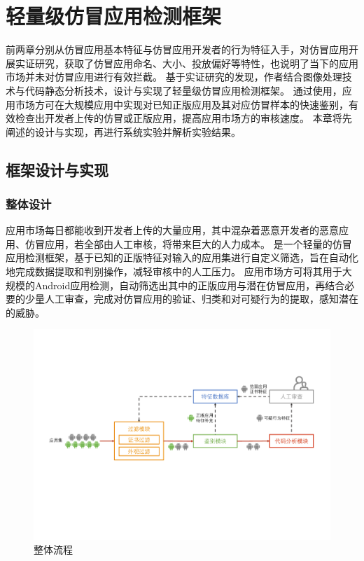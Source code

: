 \chapter{轻量级仿冒应用检测框架\mytool}
\label{chp:framework_prototype}

前两章分别从仿冒应用基本特征与仿冒应用开发者的行为特征入手，对仿冒应用开展实证研究，获取了仿冒应用命名、大小、投放偏好等特性，也说明了当下的应用市场并未对仿冒应用进行有效拦截。
基于实证研究的发现，作者结合图像处理技术与代码静态分析技术，设计与实现了轻量级仿冒应用检测框架\mytool 。
通过使用\mytool ，应用市场方可在大规模应用中实现对已知正版应用及其对应仿冒样本的快速鉴别，有效检查出开发者上传的仿冒或正版应用，提高应用市场方的审核速度。
本章将先阐述\mytool 的设计与实现，再进行系统实验并解析实验结果。

\section{框架设计与实现}

\subsection{整体设计}
应用市场每日都能收到开发者上传的大量应用，其中混杂着恶意开发者的恶意应用、仿冒应用，若全部由人工审核，将带来巨大的人力成本。
\mytool 是一个轻量的仿冒应用检测框架，基于已知的正版特征对输入的应用集进行自定义筛选，旨在自动化地完成数据提取和判别操作，减轻审核中的人工压力。
应用市场方可将其用于大规模的Android应用检测，自动筛选出其中的正版应用与潜在仿冒应用，再结合必要的少量人工审查，完成对仿冒应用的验证、归类和对可疑行为的提取，感知潜在的威胁。

\begin{figure}[htbp]
    \centering
    \includegraphics[width=\textwidth]{./Figures/edwin-fakerevealer-detector}
    \caption{\mytool 整体流程}
    \label{fig:Workflow_detector}
    \vspace{-3mm}
\end{figure}

